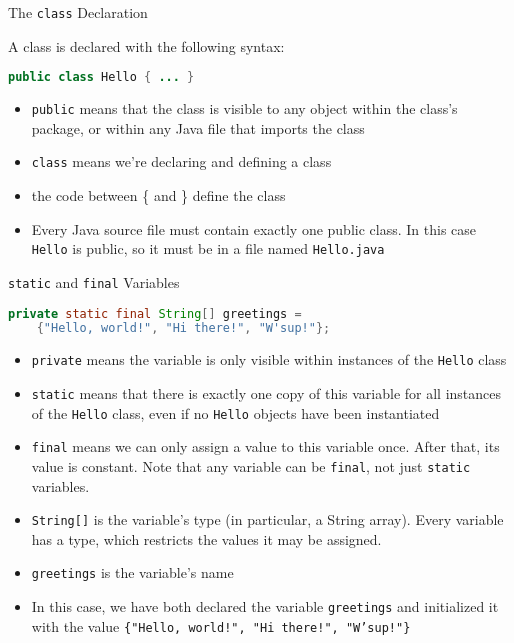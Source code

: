 \documentclass{beamer}
\begin{document}
\begin{frame}[fragile]{The {\tt class} Declaration}


A class is declared with the following syntax:
\begin{lstlisting}[language=Java]
public class Hello { ... }
\end{lstlisting}

\begin{itemize}
\item {\tt public} means that the class is visible to any object within the class's package, or within any Java file that imports the class
\item {\tt class} means we're declaring and defining a class
\item the code between \{ and \} define the class
\item Every Java source file must contain exactly one public class.  In this case {\tt Hello} is public, so it must be in a file named {\tt Hello.java}
\end{itemize}


\end{frame}

\begin{frame}[fragile]{{\tt static} and {\tt final} Variables}

\vspace{-.1in}
\begin{lstlisting}[language=Java]
private static final String[] greetings =
    {"Hello, world!", "Hi there!", "W'sup!"};
\end{lstlisting}
\vspace{-.1in}
\begin{itemize}
\item {\tt private} means the variable is only visible within instances of the {\tt Hello} class
\item {\tt static} means that there is exactly one copy of this variable for all instances of the {\tt Hello} class, even if no {\tt Hello} objects have been instantiated
\item {\tt final} means we can only assign a value to this variable once.  After that, its value is constant.  Note that any variable can be {\tt final}, not just {\tt static} variables.
\item {\tt String[]} is the variable's type (in particular, a String array).  Every variable has a type, which restricts the values it may be assigned.
\item {\tt greetings} is the variable's name
\item In this case, we have both declared the variable {\tt greetings} and initialized it with the value {\tt \{"Hello, world!", "Hi there!", "W'sup!"\}}
\end{itemize}


\end{frame}
\end{document}
